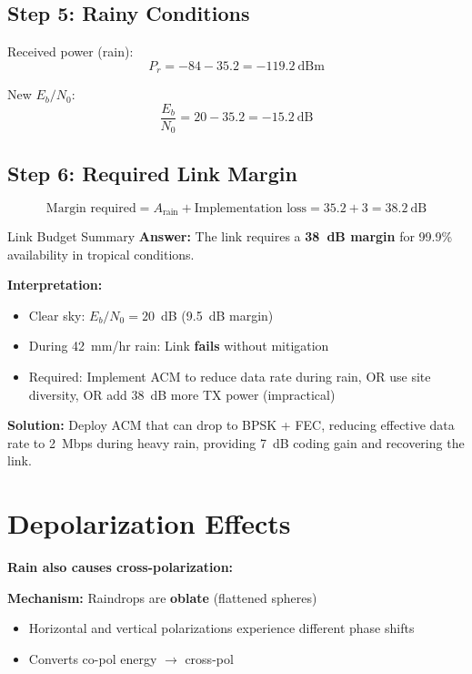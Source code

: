 \subsection*{Step 5: Rainy Conditions}

Received power (rain):
\begin{equation}
P_r = -84 - 35.2 = -119.2~\text{dBm}
\end{equation}

New $E_b/N_0$:
\begin{equation}
\frac{E_b}{N_0} = 20 - 35.2 = -15.2~\text{dB}
\end{equation}

\subsection*{Step 6: Required Link Margin}

\begin{equation}
\text{Margin required} = A_{\text{rain}} + \text{Implementation loss} = 35.2 + 3 = 38.2~\text{dB}
\end{equation}

\begin{calloutbox}[colback=black!8!white,colframe=black]{Link Budget Summary}
\textbf{Answer:} The link requires a \textbf{38~dB margin} for 99.9\% availability in tropical conditions.

\textbf{Interpretation:}
\begin{itemize}
\item Clear sky: $E_b/N_0 = 20$~dB (9.5~dB margin)
\item During 42~mm/hr rain: Link \textbf{fails} without mitigation
\item Required: Implement ACM to reduce data rate during rain, OR use site diversity, OR add 38~dB more TX power (impractical)
\end{itemize}

\textbf{Solution:} Deploy ACM that can drop to BPSK + FEC, reducing effective data rate to 2~Mbps during heavy rain, providing 7~dB coding gain and recovering the link.
\end{calloutbox}

\section{Depolarization Effects}

\textbf{Rain also causes cross-polarization:}

\textbf{Mechanism:} Raindrops are \textbf{oblate} (flattened spheres)
\begin{itemize}
\item Horizontal and vertical polarizations experience different phase shifts
\item Converts co-pol energy $\rightarrow$ cross-pol
\end{itemize}

